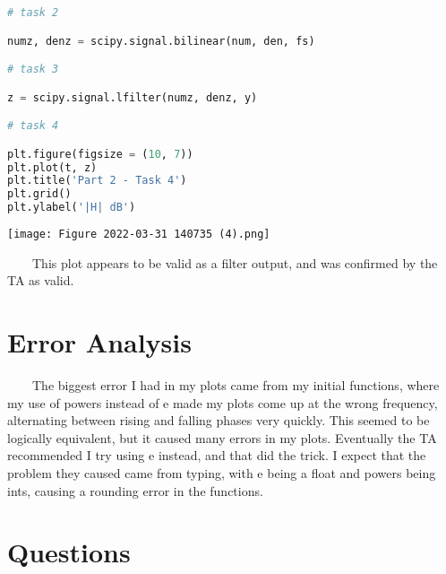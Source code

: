 \documentclass[11pt,a4]{article}
\begin{document}
\begin{lstlisting}[language=Python]
# task 2

numz, denz = scipy.signal.bilinear(num, den, fs)

# task 3

z = scipy.signal.lfilter(numz, denz, y)

# task 4

plt.figure(figsize = (10, 7))
plt.plot(t, z)
plt.title('Part 2 - Task 4')
plt.grid()
plt.ylabel('|H| dB')
\end{lstlisting}

\texttt{[image: Figure 2022-03-31 140735 (4).png]}

\ \ \ \ This plot appears to be valid as a filter output, and was confirmed by the TA as valid.

\section{Error Analysis}

\ \ \ \ The biggest error I had in my plots came from my initial functions, where my use of powers instead of e made my plots come up at the wrong frequency, alternating between rising and falling phases very quickly. This seemed to be logically equivalent, but it caused many errors in my plots. Eventually the TA recommended I try using e instead, and that did the trick. I expect that the problem they caused came from typing, with e being a float and powers being ints, causing a rounding error in the functions.

\section{Questions}
\end{document}

